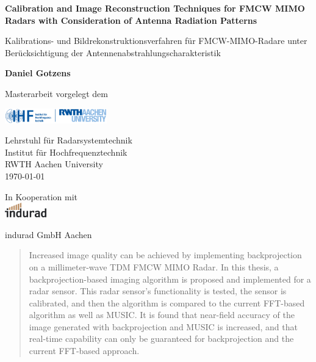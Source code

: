 \begin{titlepage}
    \begin{center}
        \vspace*{1cm}

        \huge
        \textbf{Calibration and Image Reconstruction Techniques
            for FMCW MIMO Radars with Consideration of Antenna Radiation Patterns}
        \vspace{0.5cm}

        \large
        Kalibrations- und Bildrekonstruktionsverfahren für FMCW-MIMO-Radare unter Berücksichtigung der Antennenabstrahlungscharakteristik
        \vspace{1.5cm}

        \textbf{Daniel Gotzens}

        \vfill

        \normalsize
        Masterarbeit vorgelegt dem \\

        \vspace{0.8cm}

        \includegraphics[height=18pt]{../figures/IHF-Logo_platzhalter.png}

        Lehrstuhl für Radarsystemtechnik \\
        Institut für Hochfrequenztechnik \\
        RWTH Aachen University\\
        \today

        \vspace{1cm}
        In Kooperation mit \\

        \includegraphics[height=18pt]{../figures/indurad-logo.png}

        indurad GmbH
        Aachen

    \end{center}
\end{titlepage}

\begin{abstract}
    Increased image quality can be achieved by implementing backprojection on a millimeter-wave TDM FMCW MIMO Radar.
    In this thesis, a backprojection-based imaging algorithm is proposed and implemented for a radar sensor.
    This radar sensor's functionality is tested, the sensor is calibrated,
    and then the algorithm is compared to the current FFT-based algorithm as well as MUSIC.
    It is found that near-field accuracy of the image generated with backprojection and MUSIC is increased,
    and that real-time capability can only be guaranteed for backprojection and the current FFT-based approach.
\end{abstract}